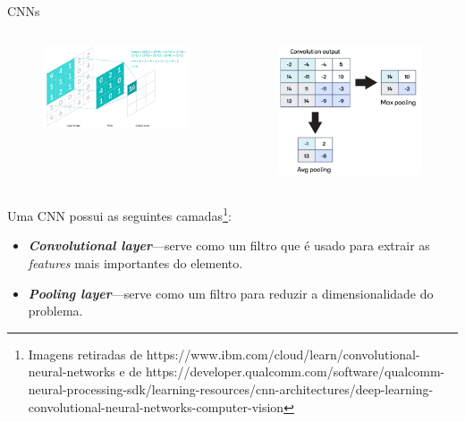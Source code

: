 \begin{frame}{CNNs \cont}

    \begin{columns}[T,onlytextwidth]

    \begin{figure}
        \centering
        \includegraphics[width=\textwidth]{img/convolution.png}
    \end{figure}


    \begin{figure}
        \centering
        \includegraphics[width=.65\textwidth]{img/pooling.png}
    \end{figure}

    \end{columns}

Uma CNN possui as seguintes camadas\footnote{\tiny{Imagens retiradas de https://www.ibm.com/cloud/learn/convolutional-neural-networks e de https://developer.qualcomm.com/software/qualcomm-neural-processing-sdk/learning-resources/cnn-architectures/deep-learning-convolutional-neural-networks-computer-vision}}:
\begin{itemize}
    \item \textit{\textbf{Convolutional layer}}---serve como um filtro que é usado para extrair as \textit{features} mais importantes do elemento.
    \pause
    \item \textit{\textbf{Pooling layer}}---serve como um filtro para reduzir a dimensionalidade do problema.
\end{itemize}


\end{frame}
